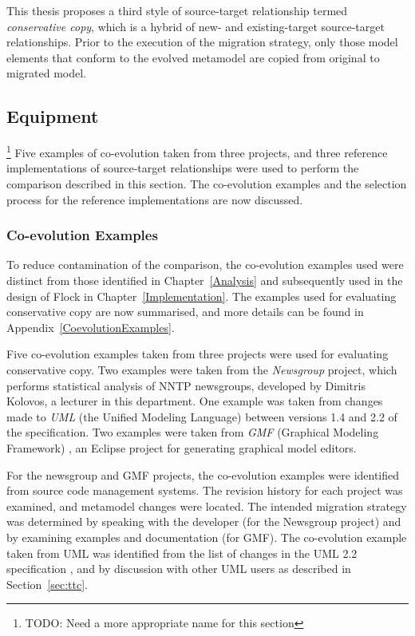 This thesis proposes a third style of source-target relationship termed \emph{conservative copy}, which is a hybrid of new- and existing-target source-target relationships. Prior to the execution of the migration strategy, only those model elements that conform to the evolved metamodel are copied from original to migrated model.


\subsection{Equipment}\footnote{TODO: Need a more appropriate name for this section}
\label{subsec:quantitive_equipment}
Five examples of co-evolution taken from three projects, and three reference implementations of source-target relationships were used to perform the comparison described in this section. The co-evolution examples and the selection process for the reference implementations are now discussed.

\subsubsection{Co-evolution Examples}
To reduce contamination of the comparison, the co-evolution examples used were distinct from those identified in Chapter~\ref{Analysis} and subsequently used in the design of Flock in Chapter~\ref{Implementation}. The examples used for evaluating conservative copy are now summarised, and more details can be found in Appendix~\ref{CoevolutionExamples}.

Five co-evolution examples taken from three projects were used for evaluating conservative copy.  Two examples were taken from the \emph{Newsgroup} project, which performs statistical analysis of NNTP newsgroups, developed by Dimitris Kolovos, a lecturer in this department. One example was taken from changes made to \emph{UML} (the Unified Modeling Language) between versions 1.4 \cite{uml14} and 2.2 \cite{uml22} of the specification. Two examples were taken from \emph{GMF} (Graphical Modeling Framework) \cite{gronback09emp}, an Eclipse project for generating graphical model editors.

For the newsgroup and GMF projects, the co-evolution examples were identified from source code management systems. The revision history for each project was examined, and metamodel changes were located. The intended migration strategy was determined by speaking with the developer (for the Newsgroup project) and by examining examples and documentation (for GMF). The co-evolution example taken from UML was identified from the list of changes in the UML 2.2 specification \cite{uml22}, and by discussion with other UML users as described in Section~\ref{sec:ttc}.

